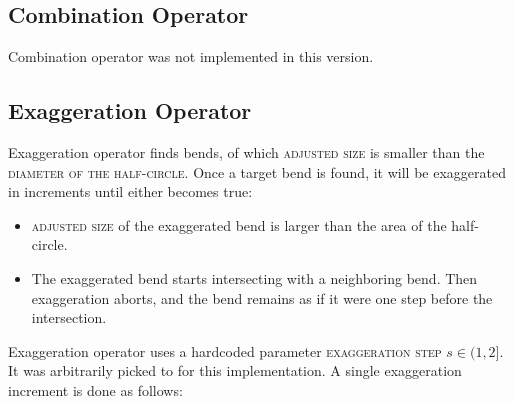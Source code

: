 \documentclass[a4paper]{article}
\begin{document}
\subsection{Combination Operator}
\label{sec:combination-operator}

Combination operator was not implemented in this version.

\subsection{Exaggeration Operator}
\label{sec:exaggeration-operator}

Exaggeration operator finds bends, of which \textsc{adjusted size} is smaller
than the \textsc{diameter of the half-circle}. Once a target bend is found, it
will be exaggerated in increments until either becomes true:

\begin{itemize}
    \item \textsc{adjusted size} of the exaggerated bend is larger than the area of
        the half-circle.

    \item The exaggerated bend starts intersecting with a neighboring bend.
        Then exaggeration aborts, and the bend remains as if it were one step
        before the intersection.

\end{itemize}

Exaggeration operator uses a hardcoded parameter \textsc{exaggeration step} $s
\in (1,2]$. It was arbitrarily picked to {\exaggerationEnthusiasm} for this
implementation. A single exaggeration increment is done as follows:
\end{document}
